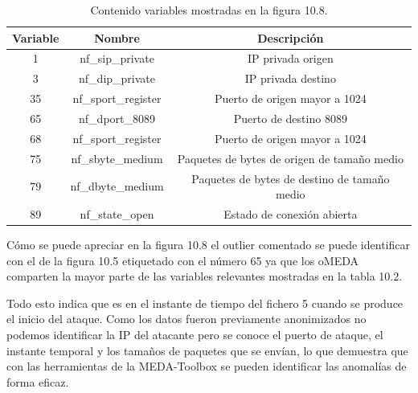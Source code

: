 \begin{table}[H]
\begin{center}
\begin{tabular}{|c|c|c|}
\hline
\textbf{Variable} &\textbf{Nombre} & \textbf{Descripción} \\
 \hline \hline

1 & nf\_sip\_private & IP privada origen\\ \hline
3 & nf\_dip\_private & IP privada destino\\ \hline
35 & nf\_sport\_register & Puerto de origen mayor a 1024 \\ \hline
65 & nf\_dport\_8089 & Puerto de destino 8089 \\ \hline
68 & nf\_sport\_register & Puerto de origen mayor a 1024 \\ \hline
75 & nf\_sbyte\_medium & Paquetes de bytes de origen de tamaño medio \\ \hline
79 & nf\_dbyte\_medium & Paquetes de bytes de destino de tamaño medio \\ \hline
89 & nf\_state\_open & Estado de conexión abierta \\ \hline

\end{tabular}
\caption{Contenido variables mostradas en la figura 10.8.}
\end{center}
\end{table}

Cómo se puede apreciar en la figura 10.8 el outlier comentado se puede identificar con el de la figura 10.5 etiquetado con el número 65 ya que los oMEDA comparten la mayor parte de las variables relevantes mostradas en la tabla 10.2.
\bigskip

Todo esto indica que es en el instante de tiempo del fichero 5 cuando se produce el inicio del ataque. Como los datos fueron previamente anonimizados no podemos identificar la IP del atacante pero se conoce el puerto de ataque, el instante temporal y los tamaños de paquetes que se envían, lo que demuestra que con las herramientas de la MEDA-Toolbox se pueden identificar las anomalías de forma eficaz.